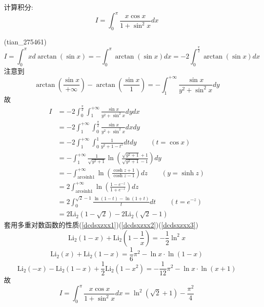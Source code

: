 \documentclass[color=green,titlestyle=hang]{elegantbook}%
\begin{document}
\begin{exercise}计算积分:\[I=\int_{0}^{\pi}{\frac{x\cos{x}}{1+\sin^{2}{x}}dx}\]\end{exercise}\begin{Solution}(tian\_275461)
\[I=\int_{0}^{\pi}{xd\arctan{(\sin{x})}}=-\int_{0}^{\pi}{\arctan{(\sin{x})}dx}=-2\int_{0}^{\frac{\pi}{2}}{\arctan{(\sin{x})}dx}\]
注意到\[\arctan{\left(\frac{\sin{x}}{+\infty}\right)}-\arctan{\left(\frac{\sin{x}}{1}\right)}=-\int_{1}^{+\infty}{\frac{\sin{x}}{y^2+\sin^2{x}}dy}\]
故\begin{align*} I&=-2\int_{0}^{\frac{\pi}{2}}{\int_{1}^{+\infty}{\frac{\sin{x}}{y^2+\sin^2{x}}dy}dx}\\ &=-2\int_{1}^{+\infty}{\int_{0}^{\frac{\pi}{2}}{\frac{\sin{x}}{y^2+\sin^2{x}}dx}dy}\\ &=-2\int_{1}^{+\infty}{\int_{0}^{1}{\frac{1}{y^2+1-t^2}dt}dy}\qquad (t=\cos{x}) \\ &=-\int_{1}^{+\infty}{\frac{1}{\sqrt{y^2+1}}\ln{\left(\frac{\sqrt{y^2+1}+1}{\sqrt{y^2+1}-1}  \right)}dy}\\ &=-\int_{\text{arcsinh}1}^{+\infty}{\ln\left(\frac{\cosh{z}+1}{\cosh{z}-1}\right)dz}\qquad (y=\sinh{z})\\ &=2\int_{\text{arcsinh}1}^{+\infty}{\ln\left(\frac{1-e^{-z}}{1+e^{-z}}\right)dz}\\ &=2\int_{0}^{\sqrt{2}-1}{\frac{\ln{(1-t)}-\ln(1+t)}{t}dt}\qquad (t=e^{-z})\\ &=2\text{Li}_{2}(1-\sqrt{2})-2\text{Li}_{2}(\sqrt{2}-1) 
\end{align*}
套用多重对数函数的性质(\ref{dcdsxzxx1})(\ref{dcdsxzxx2})(\ref{dcdsxzxx3})
\begin{equation}\label{dcdsxzxx1}
\text{Li}_{2}(1-x)+\text{Li}_{2}\left(1-\frac{1}{x}\right)=-\frac{1}{2}\ln^2{x}
\end{equation}
\begin{equation}\label{dcdsxzxx2}
\text{Li}_{2}(x)+\text{Li}_{2}(1-x)=\frac{1}{6}\pi^2-\ln{x}\cdot\ln(1-x)
\end{equation}
\begin{equation}\label{dcdsxzxx3}
\text{Li}_{2}(-x)-\text{Li}_{2}(1-x)+\frac{1}{2}\text{Li}_{2}(1-x^2)=-\frac{1}{12}\pi^2-\ln{x}\cdot\ln{(x+1)}
\end{equation}
故\[I=\int_{0}^{\pi}{\frac{x\cos{x}}{1+\sin^{2}{x}}dx}=\ln^2(\sqrt{2}+1)-\frac{\pi^2}{4}\]
\end{Solution}
\end{document}
